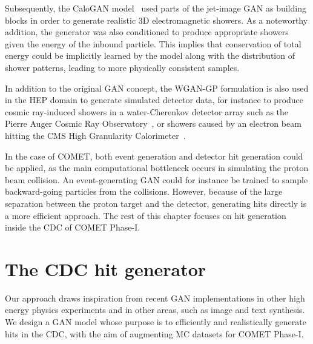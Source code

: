 Subsequently, the {\sc CaloGAN} model~\cite{paganini_calogan_2018} used parts of
the jet-image GAN as building blocks in order to generate realistic 3D
electromagnetic showers. As a noteworthy addition, the generator was also
conditioned to produce appropriate showers given the energy of the inbound
particle. This implies that conservation of total energy could be implicitly
learned by the model along with the distribution of shower patterns, leading to
more physically consistent samples.


In addition to the original GAN concept, the WGAN-GP formulation is also used in
the HEP domain to generate simulated detector data, for instance to produce
cosmic ray-induced showers in a water-Cherenkov detector array such as the
Pierre Auger Cosmic Ray Observatory~\cite{Erdmann2018}, or showers caused by an
electron beam hitting the CMS High Granularity Calorimeter~\cite{Erdmann2019}.

In the case of COMET, both event generation and detector hit generation could be
applied, as the main computational bottleneck occurs in simulating the proton
beam collision. An event-generating GAN could for instance be trained to sample
backward-going particles from the collisions. However, because of the large
separation between the proton target and the detector, generating hits directly
is a more efficient approach. The rest of this chapter focuses on hit
generation inside the CDC of COMET Phase\nobreakdash-I.





\section{The CDC hit generator}
Our approach draws inspiration from recent GAN implementations in other high
energy physics experiments and in other areas, such as image and text
synthesis. We design a GAN model whose purpose is to efficiently and
realistically generate hits in the CDC, with the aim of augmenting MC datasets
for COMET Phase\nobreakdash-I.

